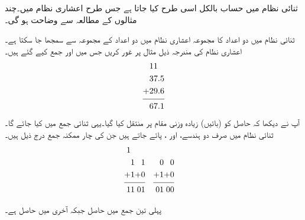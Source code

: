 	ثنائی نظام میں حساب بالکل اسی طرح کیا جاتا ہے جس طرح اعشاری نظام میں۔چند مثالوں کے مطالعہ سے  وضاحت ہو گی۔
	
	ثنائی نظام میں دو اعداد کا مجموعہ اعشاری نظام میں دو اعداد کے مجموعہ سے سمجھا جا سکتا ہے۔اعشاری نظام کی مندرجہ ذیل مثال پر غور کریں جس میں  اور      جمع کیے گئے ہیں۔
\begin{align*}
\begin{split}
&11\\
&37.5\\
+&29.6\\
\noalign{\smallskip}\hline\noalign{\smallskip}
&67.1
\end{split}
\end{align*}
آپ نے دیکھا کہ    حاصل  کو  (بائیں)   زیادہ  وزنی  مقام پر منتقل کیا   گیا۔یہی    ثنائی  جمع   میں کیا جائے گا۔ ثنائی نظام میں صرف دو ہندسے،   اور ، پائے جاتے ہیں جن  کی چار ممکنہ جمع درج ذیل ہیں۔
\begin{align*}
\begin{split}
1&\\
&1\\
+&1\\
\noalign{\smallskip}\hline\noalign{\smallskip}
1&1
\end{split}&
\begin{split}
&\\
&1\\
+&0\\
\noalign{\smallskip}\hline\noalign{\smallskip}
0&1
\end{split}&
\begin{split}
&\\
&0\\
+&1\\
\noalign{\smallskip}\hline\noalign{\smallskip}
0&1
\end{split}&
\begin{split}
&\\
&0\\
+&0\\
\noalign{\smallskip}\hline\noalign{\smallskip}
0&0
\end{split}
\end{align*}


پہلی تین جمع   میں حاصل   جبکہ آخری میں حاصل   ہے۔

